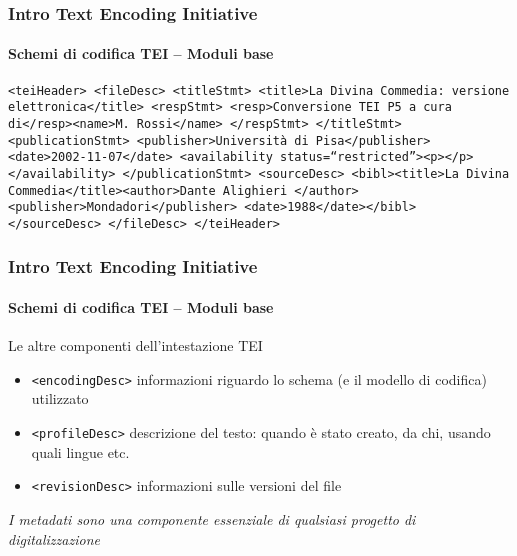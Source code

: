 \begin{frame}
	\frametitle{Intro Text Encoding Initiative}
	\framesubtitle{Schemi di codifica TEI – Moduli base}
	\addtocounter{nframe}{1}

        \texttt{<teiHeader>
        <fileDesc>
        <titleStmt>
        <title>La Divina Commedia: versione elettronica</title>
        <respStmt>
        <resp>Conversione TEI P5 a cura di</resp><name>M. Rossi</name>
        </respStmt>
        </titleStmt>
        <publicationStmt>
        <publisher>Università di Pisa</publisher>
        <date>2002-11-07</date>
        <availability status=``restricted''><p></p></availability>
        </publicationStmt>
        <sourceDesc>
        <bibl><title>La Divina Commedia</title><author>Dante Alighieri
        </author><publisher>Mondadori</publisher>
        <date>1988</date></bibl>
        </sourceDesc>
        </fileDesc>
        </teiHeader>}

\end{frame}



\begin{frame}
	\frametitle{Intro Text Encoding Initiative}
	\framesubtitle{Schemi di codifica TEI – Moduli base}
	\addtocounter{nframe}{1}

    \begin{block}{Le altre componenti dell’intestazione TEI}
        \begin{itemize}
            \item \texttt{<encodingDesc>} informazioni riguardo lo schema (e il
            modello di codifica) utilizzato
            \item  \texttt{<profileDesc>} descrizione del testo: quando è stato
            creato, da chi, usando quali lingue etc.
            \item \texttt{<revisionDesc>} informazioni sulle versioni del file
        \end{itemize}
    \end{block}
    \textit{I metadati sono una componente essenziale di qualsiasi
        progetto di digitalizzazione}
\end{frame}


